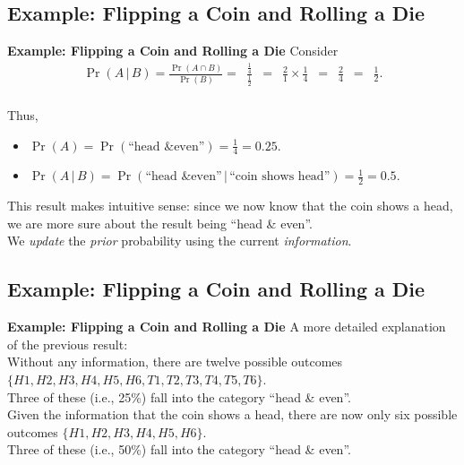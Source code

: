 \documentclass[compress]{beamer}        %
\makeatletter
\newcommand{\tcb}{\textcolor{beamer@blendedblue}}
\makeatother
\begin{document}
\subsection{Example: Flipping a Coin and Rolling a Die}
\begin{frame}{\bf \tcb{Example: Flipping a Coin and Rolling a Die}}
Consider
\begin{align*}
\Pr(A\,|\,B) = \frac{\Pr(A \cap B)}{\Pr(B)} =\,\,\, \frac{\tfrac{1}{4}}{\tfrac{1}{2}} \,\,\,=\,\,\, \frac{2}{1} \times \frac{1}{4} \,\,\,=\,\,\, \frac{2}{4} \,\,\,=\,\,\, \frac{1}{2}.\\[-0.4cm]
\end{align*}

Thus,\\[0.1cm]
\begin{itemize}\itemsep0.4cm
\item $\Pr(A) = \Pr(\text{``head \& even''}) = \tfrac{1}{4} = 0.25$.
\item $\Pr(A\,|\,B) = \Pr(\text{``head \& even''}\,|\,\text{``coin shows head''}) = \tfrac{1}{2} = 0.5$.\\[0.8cm]
\end{itemize}

This result makes intuitive sense: since we now know that the coin shows a head, we are more sure about the result being ``head \& even''.\\[0.4cm]
We \emph{update} the \emph{prior} probability using the current \emph{information}.

\end{frame}



\subsection{Example: Flipping a Coin and Rolling a Die}
\begin{frame}{\bf \tcb{Example: Flipping a Coin and Rolling a Die}}
A more detailed explanation of the previous result:\\[1.1cm]

Without any information, there are twelve possible outcomes $\{H1,H2,H3,H4,H5,H6,T1,T2,T3,T4,T5,T6\}$.\\[0.3cm]
Three of these (i.e., 25\%) fall into the category ``head \& even''.\\[1cm]

Given the information that the coin shows a head, there are now only six possible outcomes $\{H1,H2,H3,H4,H5,H6\}$.\\[0.3cm]
Three of these (i.e., 50\%) fall into the category ``head \& even''.
\end{frame}
\end{document}
